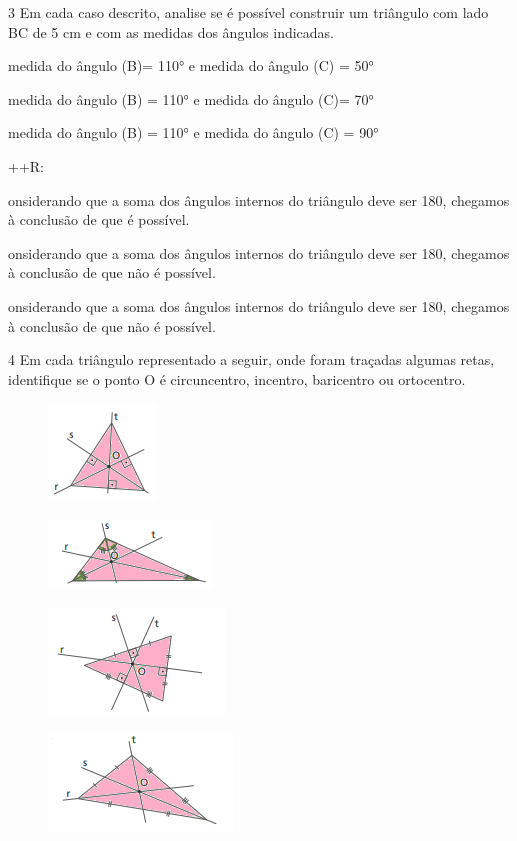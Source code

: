 \num{3} Em cada caso descrito, analise se é possível construir um triângulo
com lado BC de 5 cm e com as medidas dos ângulos indicadas.
\item medida do ângulo (B)= 110° e medida do ângulo (C) = 50°
\item medida do ângulo (B) = 110° e medida do ângulo (C)= 70°
\item medida do ângulo (B) = 110° e medida do ângulo (C) = 90°

++R:
\item onsiderando que a soma dos ângulos internos do triângulo deve ser 180,
chegamos à conclusão de que é possível.
\item onsiderando que a soma dos ângulos internos do triângulo deve ser 180,
chegamos à conclusão de que não é possível.
\item onsiderando que a soma dos ângulos internos do triângulo deve ser 180,
chegamos à conclusão de que não é possível.

\num{4} Em cada triângulo representado a seguir, onde foram traçadas algumas
retas, identifique se o ponto O é circuncentro, incentro, baricentro ou
ortocentro.
\item
\begin{figure}[H]
\centering\includegraphics[width=1.14583in,height=1.01042in]{./imgSAEB_8_MAT/media/image15.png}
\end{figure}
\item
\begin{figure}[H]
\centering\includegraphics[width=1.72917in,height=0.71875in]{./imgSAEB_8_MAT/media/image16.png}
\end{figure}
\item
\begin{figure}[H]
\centering\includegraphics[width=1.84375in,height=1.125in]{./imgSAEB_8_MAT/media/image17.png}
\end{figure}
\item
\begin{figure}[H]
\centering\includegraphics[width=1.9375in,height=1.04167in]{./imgSAEB_8_MAT/media/image18.png}
\end{figure}

